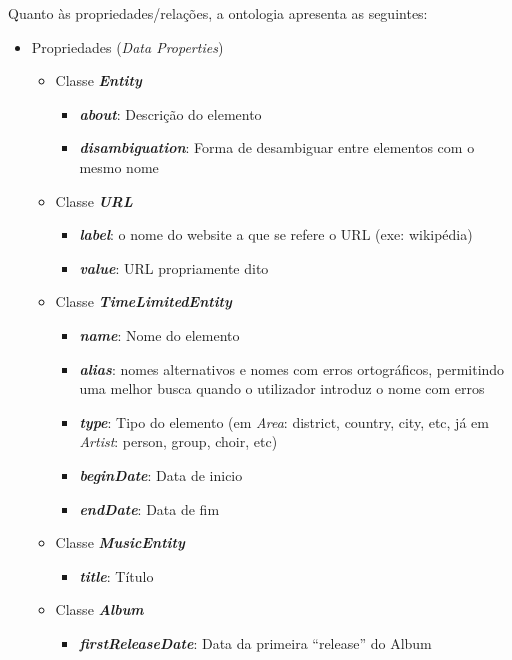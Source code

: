 \documentclass{article}
\begin{document}
Quanto às propriedades/relações, a ontologia apresenta as seguintes:
\begin{itemize}
    \item Propriedades (\textit{Data Properties})
    \begin{itemize}
        \item Classe \textbf{\textit{Entity}}
        \begin{itemize}
            \item \textbf{\textit{about}}: Descrição do elemento
            \item \textbf{\textit{disambiguation}}: Forma de desambiguar entre elementos com o mesmo nome
        \end{itemize}
        \item Classe \textbf{\textit{URL}}
        \begin{itemize}
            \item \textbf{\textit{label}}: o nome do website a que se refere o URL (exe: wikipédia)
            \item \textbf{\textit{value}}: URL propriamente dito
        \end{itemize}
        \item Classe \textbf{\textit{TimeLimitedEntity}}
        \begin{itemize}
            \item \textbf{\textit{name}}: Nome do elemento
            \item \textbf{\textit{alias}}: nomes alternativos e nomes com erros ortográficos, permitindo uma melhor busca quando o utilizador introduz o nome com erros 
            \item \textbf{\textit{type}}: Tipo do elemento (em \textit{Area}: district, country, city, etc, já em \textit{Artist}: person, group, choir, etc)
            \item \textbf{\textit{beginDate}}: Data de inicio
            \item \textbf{\textit{endDate}}: Data de fim
        \end{itemize}
        \item Classe \textbf{\textit{MusicEntity}}
        \begin{itemize}
            \item \textbf{\textit{title}}: Título
        \end{itemize}
        \item Classe \textbf{\textit{Album}}
        \begin{itemize}
            \item \textbf{\textit{firstReleaseDate}}: Data da primeira ``release'' do Album

\end{itemize}
\end{itemize}
\end{itemize}
\end{document}
